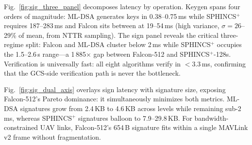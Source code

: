 Fig.~\ref{fig:sig_three_panel} decomposes latency by operation.
Keygen spans four orders of magnitude: ML-DSA generates keys in
0.38--0.75\,ms while SPHINCS$^+$ requires 187--283\,ms and Falcon
sits between at 19--54\,ms (high variance, $\sigma = 26$--29\% of
mean, from NTTR sampling).  The sign panel reveals the critical
three-regime split: Falcon and ML-DSA cluster below 2\,ms while
SPHINCS$^+$ occupies the 1.5--2.6\,s range---a 1\,885$\times$ gap
between Falcon-512 and SPHINCS$^+$-128s.  Verification is
universally fast: all eight algorithms verify in $<$3.3\,ms,
confirming that the GCS-side verification path is never the
bottleneck.

Fig.~\ref{fig:sig_dual_axis} overlays sign latency with signature
size, exposing Falcon-512's Pareto dominance: it simultaneously
minimizes both metrics.  ML-DSA signatures grow from 2.4\,KB to
4.6\,KB across levels while remaining sub-2\,ms,
whereas SPHINCS$^+$ signatures balloon to 7.9--29.8\,KB.
For bandwidth-constrained UAV links, Falcon-512's 654\,B signature
fits within a single MAVLink v2 frame without fragmentation.

